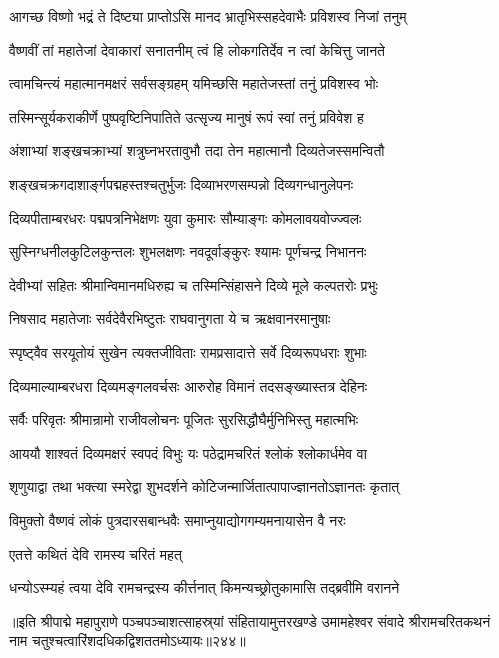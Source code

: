 \twolineshloka
{आगच्छ विष्णो भद्रं ते दिष्ट्या प्राप्तोऽसि मानद}
{भ्रातृभिस्सहदेवाभैः प्रविशस्व निजां तनुम्}%

\twolineshloka
{वैष्णवीं तां महातेजां देवाकारां सनातनीम्}
{त्वं हि लोकगतिर्देव न त्वां केचित्तु जानते}%

\twolineshloka
{त्वामचिन्त्यं महात्मानमक्षरं सर्वसङ्ग्रहम्}
{यमिच्छसि महातेजस्तां तनुं प्रविशस्व भोः}%


\twolineshloka
{तस्मिन्सूर्यकराकीर्णे पुष्पवृष्टिनिपातिते}
{उत्सृज्य मानुषं रूपं स्वां तनुं प्रविवेश ह}%

\twolineshloka
{अंशाभ्यां शङ्खचक्राभ्यां शत्रुघ्नभरतावुभौ}
{तदा तेन महात्मानौ दिव्यतेजस्समन्वितौ}%

\twolineshloka
{शङ्खचक्रगदाशार्ङ्गपद्महस्तश्चतुर्भुजः}
{दिव्याभरणसम्पन्नो दिव्यगन्धानुलेपनः}%

\twolineshloka
{दिव्यपीताम्बरधरः पद्मपत्रनिभेक्षणः}
{युवा कुमारः सौम्याङ्गः कोमलावयवोज्ज्वलः}%

\twolineshloka
{सुस्निग्धनीलकुटिलकुन्तलः शुभलक्षणः}
{नवदूर्वाङ्कुरः श्यामः पूर्णचन्द्र निभाननः}%

\twolineshloka
{देवीभ्यां सहितः श्रीमान्विमानमधिरुह्य च}
{तस्मिन्सिंहासने दिव्ये मूले कल्पतरोः प्रभुः}%

\twolineshloka
{निषसाद महातेजाः सर्वदेवैरभिष्टुतः}
{राघवानुगता ये च ऋक्षवानरमानुषाः}%

\twolineshloka
{स्पृष्ट्वैव सरयूतोयं सुखेन त्यक्तजीविताः}
{रामप्रसादात्ते सर्वे दिव्यरूपधराः शुभाः}%

\twolineshloka
{दिव्यमाल्याम्बरधरा दिव्यमङ्गलवर्चसः}
{आरुरोह विमानं तदसङ्ख्यास्तत्र देहिनः}%

\twolineshloka
{सर्वैः परिवृतः श्रीमान्रामो राजीवलोचनः}
{पूजितः सुरसिद्धौघैर्मुनिभिस्तु महात्मभिः}%

\twolineshloka
{आययौ शाश्वतं दिव्यमक्षरं स्वपदं विभुः}
{यः पठेद्रामचरितं श्लोकं श्लोकार्धमेव वा}%

\twolineshloka
{शृणुयाद्वा तथा भक्त्या स्मरेद्वा शुभदर्शने}
{कोटिजन्मार्जितात्पापाज्ज्ञानतोऽज्ञानतः कृतात्}%

\twolineshloka
{विमुक्तो वैष्णवं लोकं पुत्रदारसबान्धवैः}
{समाप्नुयाद्योगगम्यमनायासेन वै नरः}%

एतत्ते कथितं देवि रामस्य चरितं महत्

\twolineshloka
{धन्योऽस्म्यहं त्वया देवि रामचन्द्रस्य कीर्त्तनात्}
{किमन्यच्छ्रोतुकामासि तद्ब्रवीमि वरानने}%

॥इति श्रीपाद्मे महापुराणे पञ्चपञ्चाशत्साहस्र्यां संहितायामुत्तरखण्डे उमामहेश्वर संवादे श्रीरामचरितकथनं नाम चतुश्चत्वारिंशदधिकद्विशततमोऽध्यायः॥२४४॥



